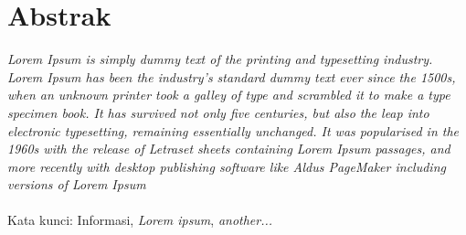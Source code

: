 %
%
%

\chapter*{Abstrak}



\begin{singlespace} %
{

         \textit{Lorem Ipsum is simply dummy text of the printing and typesetting industry. Lorem Ipsum has been the industry's standard dummy text ever since the 1500s, when an unknown printer took a galley of type and scrambled it to make a type specimen book. It has survived not only five centuries, but also the leap into electronic typesetting, remaining essentially unchanged. It was popularised in the 1960s with the release of Letraset sheets containing Lorem Ipsum passages, and more recently with desktop publishing software like Aldus PageMaker including versions of Lorem Ipsum} \\ \\
    Kata kunci:
	Informasi, \textit{Lorem ipsum}, \textit{another...}
}
\end{singlespace}
